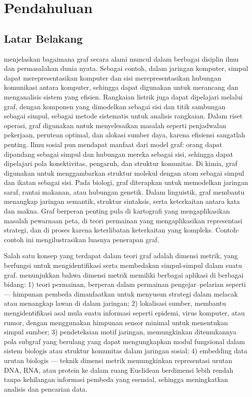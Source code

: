 \chapter{Pendahuluan}

\section{Latar Belakang}
\label{sec:application}

\cite{bondy1976} menjelaskan bagaimana graf secara alami muncul dalam berbagai disiplin ilmu dan permasalahan dunia nyata. Sebagai contoh, dalam jaringan komputer, simpul dapat merepresentasikan komputer dan sisi merepresentasikan hubungan komunikasi antara komputer, sehingga dapat digunakan untuk merancang dan menganalisis sistem yang efisien. Rangkaian listrik juga dapat dipelajari melalui graf, dengan komponen yang dimodelkan sebagai sisi dan titik sambungan sebagai simpul, sebagai metode sistematis untuk analisis rangkaian. Dalam riset operasi, graf digunakan untuk menyelesaikan masalah seperti penjadwalan pekerjaan, perutean optimal, dan alokasi sumber daya, karena efisiensi sangatlah penting. Ilmu sosial pun mendapat manfaat dari model graf: orang dapat dipandang sebagai simpul dan hubungan mereka sebagai sisi, sehingga dapat dipelajari pola konektivitas, pengaruh, dan struktur komunitas. Di kimia, graf digunakan untuk menggambarkan struktur molekul dengan atom sebagai simpul dan ikatan sebagai sisi. Pada biologi, graf diterapkan untuk memodelkan jaringan saraf, rantai makanan, atau hubungan genetik. Dalam linguistik, graf membantu menangkap jaringan semantik, struktur sintaksis, serta keterkaitan antara kata dan makna. Graf berperan penting pula di kartografi yang mengaplikasikan masalah pewarnaan peta, di teori permainan yang mengaplikasikan representasi strategi, dan di proses  karena keterlibatan keterkaitan yang kompleks. Contoh-contoh ini mengilustrasikan luasnya penerapan graf.

Salah satu konsep yang terdapat dalam teori graf adalah dimensi metrik, yang berfungsi untuk mengidentifikasi serta membedakan simpul-simpul dalam suatu graf. \cite{tillquist2023} menunjukkan bahwa dimensi metrik memiliki berbagai aplikasi di berbagai bidang: 1) teori permainan, berperan dalam permainan pengejar–pelarian seperti  --- himpunan pembeda dimanfaatkan untuk menyusun strategi dalam melacak atau menangkap lawan di dalam jaringan; 2) lokalisasi sumber, membantu mengidentifikasi asal mula suatu informasi seperti epidemi, virus komputer, atau rumor, dengan menggunakan himpunan sensor minimal untuk menentukan simpul sumber; 3) pendeteksian motif jaringan, memungkinkan ditemukannya pola subgraf yang berulang yang dapat mengungkapkan modul fungsional dalam sistem biologis atau struktur komunitas dalam jaringan sosial; 4) embedding data urutan biologis --- teknik dimensi metrik memungkinkan representasi urutan DNA, RNA, atau protein ke dalam ruang Euclidean berdimensi lebih rendah tanpa kehilangan informasi pembeda yang esensial, sehingga meningkatkan analisis dan pencarian data.

